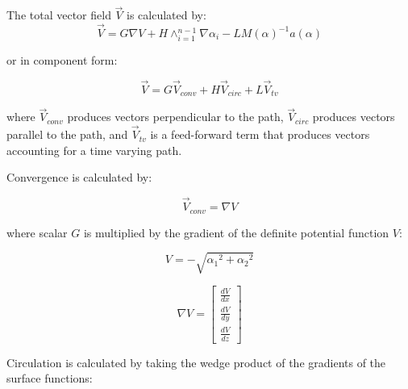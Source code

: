 \documentclass[conf]{new-aiaa}
\begin{document}



The total vector field $\overrightarrow{V}$ is calculated by:
\begin{equation}\label{eq:GVF}
\overrightarrow{V} = G \nabla V + H \wedge_{i=1}^{n-1}\nabla\alpha_i  - LM(\alpha)^{-1} a(\alpha)
\end{equation}

or in component form:

\begin{equation}\label{simpleGVF}
\overrightarrow{V} = G\overrightarrow{V}_{conv} + H\overrightarrow{V}_{circ} + L\overrightarrow{V}_{tv} 
\end{equation}	

where $\overrightarrow{V}_{conv}$ produces vectors perpendicular to the path, $\overrightarrow{V}_{circ}$ produces vectors parallel to the path, and $\overrightarrow{V}_{tv}$ is a feed-forward term that produces vectors accounting for a time varying path. 

Convergence is calculated by:

\begin{equation}
\vec{V}_{conv} = \nabla V  
\label{convOnly}
\end{equation}


where scalar $G$ is multiplied by the gradient of the definite potential function $V$:

\begin{equation}
V = -\sqrt{{\alpha_1}^2 + {\alpha_2}^2}
\end{equation}

\begin{equation}
\label{eq:gradV}
\nabla V =\begin{bmatrix}
\frac{dV}{dx} \\
\frac{dV}{dy} \\
\frac{dV}{dz}
\end{bmatrix}
\end{equation}



Circulation is calculated by taking the wedge product of the gradients of the surface functions:
\end{document}
